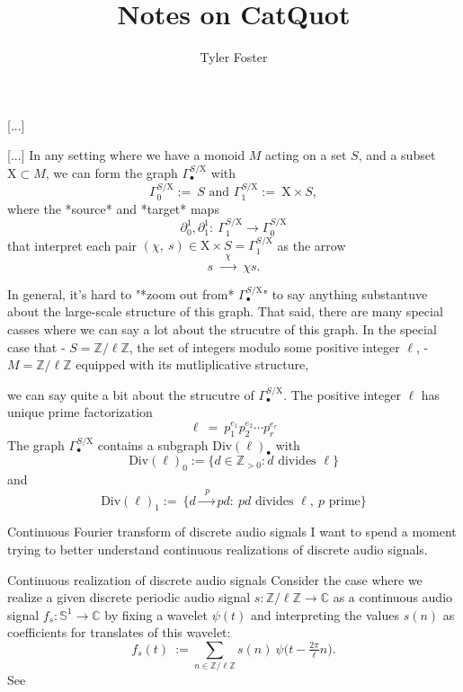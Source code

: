 \documentclass[11pt, a4paper]{article}
\newcommand{\Chi}{\mathrm{X}}
\begin{document}
\title{Notes on CatQuot}

\author{Tyler Foster}

\maketitle

\begin{section}{[...]}

\begin{subsection}{[...]}
In any setting where we have a monoid $M$ acting on a set $S$, and a subset $\Chi\subset M$, we can form the graph $\Gamma^{S/\Chi}_{\bullet}$ with
$$
\Gamma^{S/\Chi}_{0}:=\ S\text{\ \ \ \ \ \ and\ \ \ \ \ \ }\Gamma^{S/\Chi}_{1}:=\ \Chi\times S,
$$
where the *source* and *target* maps $$\partial^{1}_0,\partial^{1}_1:\ \Gamma^{S/\Chi}_1\!\!\longrightarrow\Gamma^{S/\Chi}_{0}$$ that interpret each pair $(\chi,\ s)\in \Chi\times S=\Gamma^{S/\Chi}_1$ as the arrow $$s\ \!\xrightarrow{\ \ \ \chi\ \ \ }\ \!\chi s.$$

In general, it's hard to "*zoom out from* $\Gamma^{S/\Chi}_{\bullet}$" to say anything substantuve about the large-scale structure of this graph. That said, there are many special casses where we can say a lot about the strucutre of this graph. In the special case that 
- $S=\mathbb{Z}/\ell\mathbb{Z}$, the set of integers modulo some positive integer $\ell$,
- $M=\mathbb{Z}/\ell\mathbb{Z}$ equipped with its mutliplicative structure,

we can say quite a bit about the strucutre of $\Gamma^{S/\Chi}_{\bullet}$. The positive integer $\ell$ has unique prime factorization $$\ell\ =\ p_{1}^{e_1}p_{2}^{e_2}\cdots p_{r}^{e_r}$$ The graph $\Gamma^{S/\Chi}_{\bullet}$ contains a subgraph $\text{Div}(\ell)_{\bullet}$ with $$\text{Div}(\ell)_{0}:=\{d\in\mathbb{Z}_{>0}:d\text{\ divides\ }\ell\}$$ and $$\text{Div}(\ell)_{1}:=\ \{d\xrightarrow{\ \ \ p\ \ }pd:\ pd\text{\ divides\ }\ell,\ p\text{\ prime}\}$$
\end{subsection}

\begin{subsection}{Continuous Fourier transform of discrete audio signals}
I want to spend a moment trying to better understand continuous realizations of discrete audio signals.

\begin{subsubsection}{Continuous realization of discrete audio signals}
Consider the case where we realize a given discrete periodic audio signal $s:\mathbb{Z}/\ell\mathbb{Z}\longrightarrow\mathbb{C}$ as a continuous audio signal $f_{\!s}:\mathbb{S}^1\!\longrightarrow\mathbb{C}$ by fixing a wavelet $\psi(t)$ and interpreting the values $s(n)$ as coefficients for translates of this wavelet:
$$
f_{\!s}(t)
\ :=\!\!
\sum_{n\in\mathbb{Z}/\ell\mathbb{Z}}
\!\!\!s(n)\ \psi\big(t\!-\!\tfrac{2\pi}{\ell}n\big).
$$
See \cite{Mallat}
\end{subsubsection}


\end{subsection}
\end{section}
\end{document}

